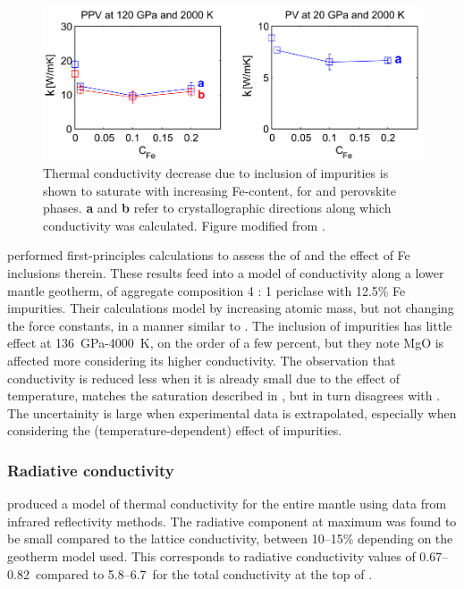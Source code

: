 \begin{figure}[h!]
  \includegraphics[width=\linewidth]{Figures/ammann_saturation.png}
  \caption[Thermal conductivity against Fe-content]{Thermal conductivity decrease due to inclusion of impurities is shown to saturate with increasing Fe-content, for \mgsios \ppv and perovskite phases. \textbf{a} and \textbf{b} refer to crystallographic directions along which conductivity was calculated. Figure modified from \citet{Ammann2014}.}
  \label{fig:ammann_sat}
\end{figure}

\citet{Tang2014} performed first-principles calculations to assess the \tcs of \mgsios
and the effect of Fe inclusions therein. These results feed into a model of conductivity along a lower mantle geotherm, of aggregate composition 4 \bdg : 1 periclase with 12.5\% Fe impurities. Their calculations model \mgfesios by increasing atomic mass, but not changing the force constants, in a manner similar to \citet{Ammann2014}. The inclusion of impurities has little effect at 136~GPa-4000~K, on the order of a few percent, but they note MgO is affected more considering its higher conductivity. The observation that conductivity is reduced less when it is already small due to the effect of temperature, matches the saturation described in \citet{Ammann2014}, but in turn disagrees with \citet{Haigis2012}. The uncertainity is large when experimental data is extrapolated, especially when considering the (temperature-dependent) effect of impurities.



\subsubsection{Radiative conductivity}
\label{sec:rad_cond}

\citet{Hofmeister1999} produced a model of thermal conductivity for the entire mantle using data from infrared reflectivity methods. The radiative component at maximum was found to be small compared to the lattice conductivity, between 10--15\% depending on the geotherm model used. This corresponds to radiative conductivity values of 0.67--0.82~\wmks compared to 5.8--6.7~\wmks for the total conductivity at the top of \ddd.

